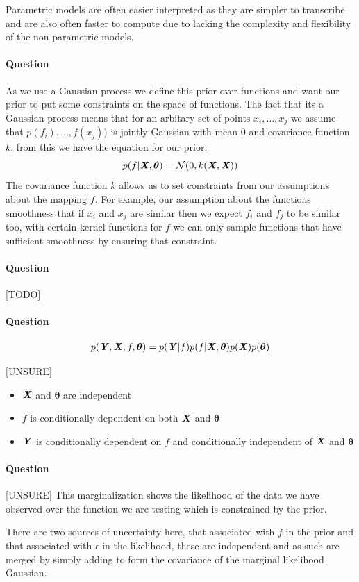 \documentclass{article}
\newcounter{question}
\newcommand{\question}{\stepcounter{question}\paragraph{Question \thequestion}}
\newcommand{\mat}[1]{\textbf{\textit{#1}}}
\begin{document}
Parametric models are often easier interpreted as they are simpler to transcribe and are also often faster to compute due to lacking the complexity and flexibility of the non-parametric models.
\question As we use a Gaussian process we define this prior over functions and want our prior to put some constraints on the space of functions. The fact that its a Gaussian process means that for an arbitary set of points $x_i, \ldots, x_j$ we assume that $p(f_i), \ldots,f(x_j))$ is jointly Gaussian with mean $0$ and covariance function $k$, from this we have the equation for our prior:
$$
	p(f|\mat{X},\bm{\theta}) = \mathcal{N}(0, k(\mat{X},\mat{X}))
$$
The covariance function $k$ allows us to set constraints from our assumptions about the mapping $f$. For example, our assumption about the functions smoothness that if $x_i$ and $x_j$ are similar then we expect $f_i$ and $f_j$ to be similar too, with certain kernel functions for $f$ we can only sample functions that have sufficient smoothness by ensuring that constraint.
\question [TODO]
\question
\begin{align*}
	p(\mat{Y},\mat{X},f,\bm{\theta}) = p(\mat{Y}|f)p(f|\mat{X},\bm{\theta})p(\mat{X})p(\bm{\theta})
\end{align*}
\begin{center}
\end{center}
[UNSURE]
\begin{itemize}
	\item $\mat{X}$ and $\bm{\theta}$ are independent
	\item $f$ is conditionally dependent on both $\mat{X}$ and $\bm{\theta}$
	\item $\mat{Y}$ is conditionally dependent on $f$ and conditionally independent of $\mat{X}$ and $\bm{\theta}$
\end{itemize}
\question [UNSURE] This marginalization shows the likelihood of the data we have observed over the function we are testing which is constrained by the prior.

There are two sources of uncertainty here, that associated with $f$ in the prior and that associated with $\epsilon$ in the likelihood, these are independent and as such are merged by simply adding to form the covariance of the marginal likelihood Gaussian.
\end{document}
